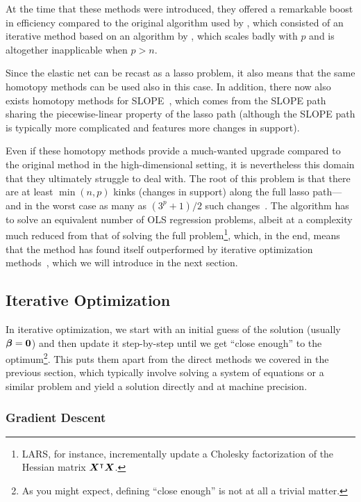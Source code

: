 At the time that these methods were introduced, they offered a remarkable boost in efficiency compared to the original algorithm used by \textcite{tibshirani1996}, which consisted of an iterative method based on an algorithm by \textcite{lawson1995}, which scales badly with \(p\) and is altogether inapplicable when \(p > n\).

Since the elastic net can be recast as a lasso problem, it also means that the same homotopy methods can be used also in this case. In addition, there now also exists homotopy methods for SLOPE~\parencite{nomura2020,dupuis2023}, which comes from the SLOPE path sharing the piecewise-linear property of the lasso path (although the SLOPE path is typically more complicated and features more changes in support).

Even if these homotopy methods provide a much-wanted upgrade compared to the original method in the high-dimensional setting, it is nevertheless this domain that they ultimately struggle to deal with. The root of this problem is that there are at least \(\min(n,p)\) kinks (changes in support) along the full lasso path---and in the worst case as many as \((3^p + 1)/2\) such changes~\parencite{mairal2012}. The algorithm has to solve an equivalent number of OLS regression problems, albeit at a complexity much reduced from that of solving the full problem\footnote{LARS, for instance, incrementally update a Cholesky factorization of the Hessian matrix \(\boldsymbol{X}^\intercal\boldsymbol{X}\).}, which, in the end, means that the method has found itself outperformed by iterative optimization methods~\parencite{friedman2010}, which we will introduce in the next section.

\subsection{Iterative Optimization}\label{sec:iterative-optimization}

In iterative optimization, we start with an initial guess of the solution (usually \(\boldsymbol{\beta} = \boldsymbol{0}\)) and then update it step-by-step until we get ``close enough'' to the optimum\footnote{As you might expect, defining ``close enough'' is not at all a trivial matter.}. This puts them apart from the direct methods we covered in the previous section, which typically involve solving a system of equations or a similar problem and yield a solution directly and at machine precision.

\subsubsection{Gradient Descent}

